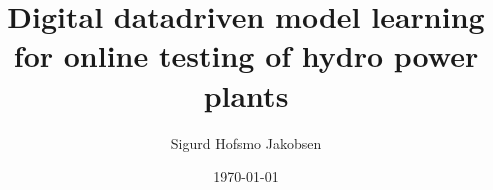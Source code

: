 \title{Digital datadriven model learning for online testing of hydro power plants}
\author{Sigurd Hofsmo Jakobsen}
\date{\today}

\begin{frame}
  \titlepage
\end{frame}
